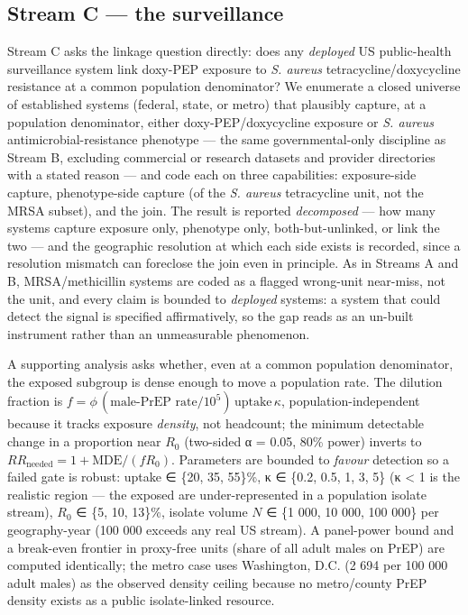 \documentclass[10pt,letterpaper]{article}
\begin{document}
\subsection*{Stream C --- the surveillance}

Stream C asks the linkage question directly: does any \emph{deployed} US
public-health surveillance system link doxy-PEP exposure to \emph{S.
aureus} tetracycline/doxycycline resistance at a common population
denominator? We enumerate a closed universe of established systems
(federal, state, or metro) that plausibly capture, at a population
denominator, either doxy-PEP/doxycycline exposure or \emph{S. aureus}
antimicrobial-resistance phenotype --- the same governmental-only
discipline as Stream B, excluding commercial or research datasets and
provider directories with a stated reason --- and code each on three
capabilities: exposure-side capture, phenotype-side capture (of the
\emph{S. aureus} tetracycline unit, not the MRSA subset), and the join.
The result is reported \emph{decomposed} --- how many systems capture
exposure only, phenotype only, both-but-unlinked, or link the two ---
and the geographic resolution at which each side exists is recorded,
since a resolution mismatch can foreclose the join even in principle. As
in Streams A and B, MRSA/methicillin systems are coded as a flagged
wrong-unit near-miss, not the unit, and every claim is bounded to
\emph{deployed} systems: a system that could detect the signal is
specified affirmatively, so the gap reads as an un-built instrument
rather than an unmeasurable phenomenon.

A supporting analysis asks whether, even at a common population
denominator, the exposed subgroup is dense enough to move a population
rate. The dilution fraction is \(f =
\phi\,(\text{male-PrEP rate}/10^5)\,\text{uptake}\,\kappa\),
population-independent because it tracks exposure \emph{density}, not
headcount; the minimum detectable change in a proportion near \(R_0\)
(two-sided α = 0.05, 80\% power) inverts to \(RR_\text{needed} = 1 +
\text{MDE}/(f R_0)\). Parameters are bounded to \emph{favour} detection
so a failed gate is robust: uptake ∈ \{20, 35, 55\}\%, κ ∈ \{0.2, 0.5,
1, 3, 5\} (κ \textless{} 1 is the realistic region --- the exposed are
under-represented in a population isolate stream), \(R_0\) ∈ \{5, 10,
13\}\%, isolate volume \(N\) ∈ \{1 000, 10 000, 100 000\} per
geography-year (100 000 exceeds any real US stream). A panel-power bound
and a break-even frontier in proxy-free units (share of all adult males
on PrEP) are computed identically; the metro case uses Washington, D.C.
(2 694 per 100 000 adult males) as the observed density ceiling because
no metro/county PrEP density exists as a public isolate-linked resource.
\end{document}
